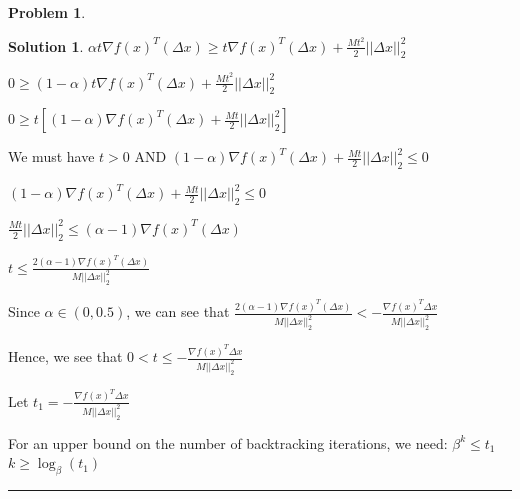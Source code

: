 \documentclass{article}
\theoremstyle{definition}
\newtheorem{problem}{Problem}
\def\fline{\rule{0.75\linewidth}{0.5pt}}
\newcommand{\finishline}{\begin{center}\fline\end{center}}
\newtheorem*{solution*}{Solution}
\newenvironment{solution}{\begin{solution*}}{{\finishline} \end{solution*}}
\begin{document}
\begin{problem}
\begin{solution}
$\alpha t\nabla f(x)^T (\Delta x) \geq t\nabla f(x)^T (\Delta x) + \frac{Mt^2}{2} ||\Delta x||^2_2$

$0 \geq (1 - \alpha) t \nabla f(x)^T (\Delta x) + \frac{Mt^2}{2} ||\Delta x||^2_2$

$0 \geq t[(1 - \alpha) \nabla f(x)^T (\Delta x) + \frac{Mt}{2} ||\Delta x||^2_2]$

We must have $t > 0$ AND $(1 - \alpha) \nabla f(x)^T (\Delta x) + \frac{Mt}{2} ||\Delta x||^2_2 \leq 0$

$(1 - \alpha) \nabla f(x)^T (\Delta x) + \frac{Mt}{2} ||\Delta x||^2_2 \leq 0$ \newline 

$\frac{Mt}{2} ||\Delta x||^2_2 \leq (\alpha - 1) \nabla f(x)^T (\Delta x)$ \newline 

$t \leq \frac{2(\alpha - 1) \nabla f(x)^T (\Delta x)}{M||\Delta x||^2_2}$ \newline 



Since $\alpha \in (0, 0.5)$, we can see that $\frac{2(\alpha - 1) \nabla f(x)^T (\Delta x)}{M||\Delta x||^2_2} < -\frac{\nabla f(x)^T \Delta x}{M ||\Delta x||^2_2}$ \newline 

Hence, we see that $0 < t \leq -\frac{\nabla f(x)^T \Delta x}{M ||\Delta x||^2_2}$

Let $t_1 = -\frac{\nabla f(x)^T \Delta x}{M ||\Delta x||^2_2}$ \newline

For an upper bound on the number of backtracking iterations, we need: \newline 
$\beta^k \leq t_1$ \newline
$k \geq \log _{\beta}(t_1)$ \newline

\end{solution}
\end{problem}
\end{document}
